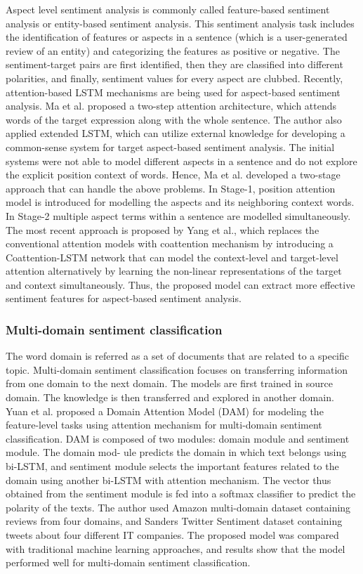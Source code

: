 Aspect level sentiment analysis is commonly called feature-based sentiment analysis or
entity-based sentiment analysis. This sentiment analysis task includes the identification of
features or aspects in a sentence (which is a user-generated review of an entity) and categorizing the features as positive or negative. The sentiment-target pairs are first identified, then they are classified into different polarities, and finally, sentiment values for every aspect are clubbed. Recently, attention-based LSTM mechanisms are being used for aspect-based sentiment analysis. Ma et al.\cite{Ma_2018} proposed a two-step attention architecture, which attends words of the target expression along with the whole sentence. The author also applied extended LSTM, which can utilize external knowledge for developing a common-sense system for target aspect-based sentiment analysis. The initial systems were not able to model different aspects in a sentence and do not explore the explicit position context of words. Hence, Ma et al.\cite{Ma_2019} developed a two-stage approach that can handle the above problems. In Stage-1, position attention model is introduced for modelling the aspects and its neighboring context words. In Stage-2 multiple aspect terms within a sentence are modelled simultaneously. The most recent approach is proposed by Yang et al.\cite{Yang_2019a}, which replaces the conventional attention models with coattention mechanism by introducing a Coattention-LSTM network that can model the context-level and target-level attention alternatively by learning the non-linear representations of the target and context simultaneously. Thus, the proposed model can extract more effective sentiment features for aspect-based sentiment analysis.

\subsubsection{Multi-domain sentiment classification}

The word domain is referred as a set of documents that are related to a specific topic. Multi-domain sentiment classification focuses on transferring information from one domain to the next domain. The models are first trained in source domain. The knowledge is then transferred and explored in another domain. Yuan et al.\cite{Yuan_2018} proposed a Domain Attention Model (DAM) for modeling the feature-level tasks using attention mechanism for multi-domain sentiment classification. DAM is composed of two modules: domain module and sentiment module. The domain mod- ule predicts the domain in which text belongs using bi-LSTM, and sentiment module selects the important features related to the domain using another bi-LSTM with attention mechanism. The vector thus obtained from the sentiment module is fed into a softmax classifier to predict the polarity of the texts. The author used Amazon multi-domain dataset containing reviews from four domains, and Sanders Twitter Sentiment dataset containing tweets about four different IT companies. The proposed model was compared with traditional machine learning approaches, and results show that the model performed well for multi-domain sentiment classification.

